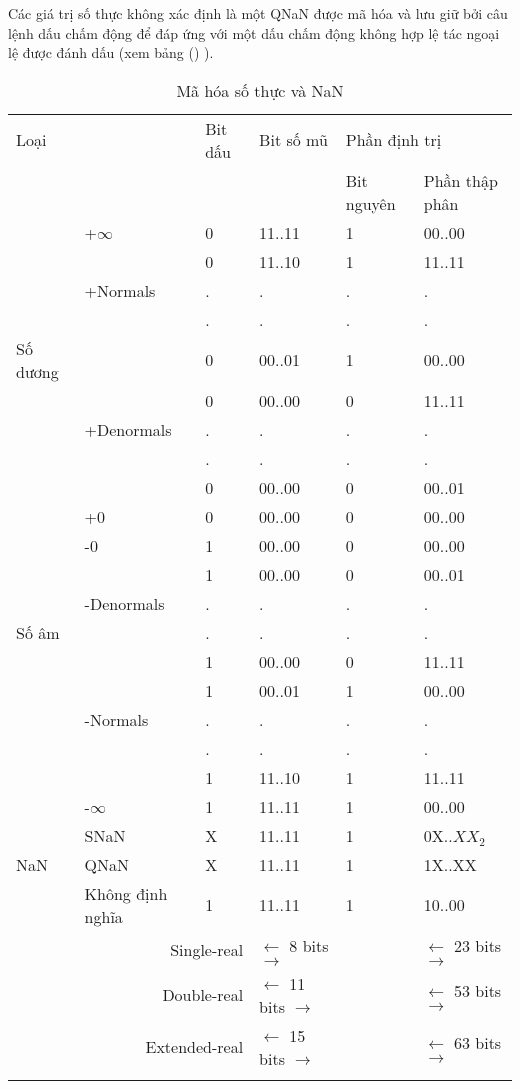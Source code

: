 	Các giá trị số thực không xác định là một QNaN được mã hóa và lưu giữ bởi câu lệnh dấu chấm động để đáp ứng với một dấu chấm động không hợp lệ tác ngoại lệ được đánh dấu (xem bảng () ).	
		\begin{longtable}{|l|l|l|l|l|l|}
			\hline
				\multicolumn{2}{|l|}{Loại} & Bit dấu & Bit số mũ & \multicolumn{2}{l|}{Phần định trị} \\
				\cline{5-6}
				\multicolumn{2}{|l|}{} & & & Bit nguyên & Phần thập phân \\
			\hline
				 & +$\mathbb{\infty}$ & 0 & 11..11 & 1 & 00..00 \\
				\cline{2-6}
				  & & 0 & 11..10 & 1 & 11..11 \\
				  & +Normals & . & .& . & . \\
				  & & . & . & . & . \\
				 Số dương & & 0 & 00..01 & 1 & 00..00 \\
				 	\cline{2-6}
				  & & 0 & 00..00 & 0 & 11..11 \\
				  & +Denormals& . & .& . & . \\
				  & & . & . & . & . \\
				  & & 0 & 00..00 & 0 & 00..01 \\
				  \cline{2-6}
				  & +0 & 0& 00..00 & 0 & 00..00 \\
			\hline			
				  & -0 & 1 & 00..00 & 0 & 00..00 \\
				\cline{2-6}
				  & & 1 & 00..00 & 0 & 00..01 \\
				  & -Denormals& . & .& . & . \\
				 Số âm & & . & . & . & . \\
				  & & 1 & 00..00 & 0 & 11..11 \\
				\cline{2-6}
				  & & 1 & 00..01 & 1 & 00..00 \\
				  & -Normals & . & .& . & . \\
				  & & . & . & . & . \\
				  & & 1 & 11..10 & 1 & 11..11 \\
				 \cline{2-6}
				  & -$\mathbb{\infty}$ & 1 & 11..11 & 1 & 00..00 \\
			\hline			
				  & SNaN & X & 11..11 & 1&  0X..$XX_2$ \\
				\cline{2-6}
				 NaN & QNaN & X & 11..11 & 1& 1X..XX\\
				\cline{2-6}
				  & Không định nghĩa &1 & 11..11& 1  &10..00 \\
			\hline
				\multicolumn{3}{r|}{Single-real} & $\leftarrow$ 8 bits $\to $ & & $\leftarrow$ 23 bits $\to $ \\
				\multicolumn{3}{r|}{Double-real} & $\leftarrow$ 11 bits $\to $ & & $\leftarrow$ 53 bits $\to $ \\
				\multicolumn{3}{r|}{Extended-real} & $\leftarrow$ 15 bits $\to $ & & $\leftarrow$ 63 bits $\to $ \\
				\caption{Mã hóa số thực và NaN}
				\label{tb:MaHoaSoThuc}
		\end{longtable}	
	

